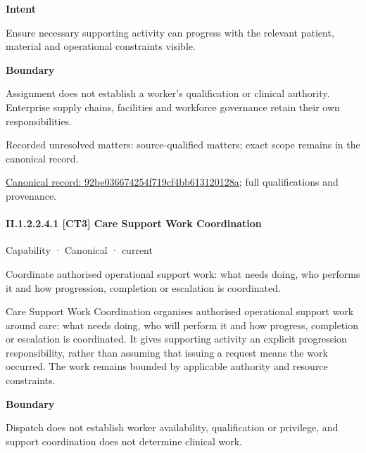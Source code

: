 \textbf{Intent}



Ensure necessary supporting activity can progress with the relevant patient, material and operational constraints visible.



\textbf{Boundary}



Assignment does not establish a worker's qualification or clinical authority. Enterprise supply chains, facilities and workforce governance retain their own responsibilities.


{\small Recorded unresolved matters: source-qualified matters; exact scope remains in the canonical record.}\par
{\footnotesize \href{../../../../continuum/strategy/capability/92be036674254f719cf4bb613120128a.md}{Canonical record: 92be036674254f719cf4bb613120128a}; full qualifications and provenance.}\par
\paragraph*{II.1.2.2.4.1 [CT3] Care Support Work Coordination}
\label{navigation:II.1.2.2.4.1}

\label{element:f9f5c69b0f0b472287cd4ac56ccff6f3}
{\small Capability · Canonical · current}\par

Coordinate authorised operational support work: what needs doing, who performs it and how progression, completion or escalation is coordinated.



Care Support Work Coordination organises authorised operational support work around care: what needs doing, who will perform it and how progress, completion or escalation is coordinated. It gives supporting activity an explicit progression responsibility, rather than assuming that issuing a request means the work occurred. The work remains bounded by applicable authority and resource constraints.



\textbf{Boundary}



Dispatch does not establish worker availability, qualification or privilege, and support coordination does not determine clinical work.


